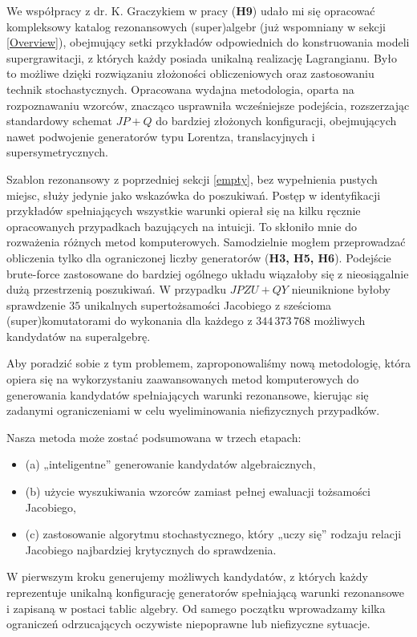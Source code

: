 \documentclass[12pt,a4paper]{article}
\begin{document}
We współpracy z dr. K. Graczykiem w pracy (\textbf{H9}) udało mi się opracować kompleksowy katalog rezonansowych (super)algebr (już wspomniany w sekcji \eqref{Overview}), obejmujący setki przykładów odpowiednich do konstruowania modeli supergrawitacji, z których każdy posiada unikalną realizację Lagrangianu. Było to możliwe dzięki rozwiązaniu złożoności obliczeniowych oraz zastosowaniu technik stochastycznych. Opracowana wydajna metodologia, oparta na rozpoznawaniu wzorców, znacząco usprawniła wcześniejsze podejścia, rozszerzając standardowy schemat $JP+Q$ do bardziej złożonych konfiguracji, obejmujących nawet podwojenie generatorów typu Lorentza, translacyjnych i supersymetrycznych.

Szablon rezonansowy z poprzedniej sekcji \eqref{empty}, bez wypełnienia pustych miejsc, służy jedynie jako wskazówka do poszukiwań. Postęp w identyfikacji przykładów spełniających wszystkie warunki opierał się na kilku ręcznie opracowanych przypadkach bazujących na intuicji. To skłoniło mnie do rozważenia różnych metod komputerowych. Samodzielnie mogłem przeprowadzać obliczenia tylko dla ograniczonej liczby generatorów (\textbf{H3, H5, H6}). Podejście brute-force zastosowane do bardziej ogólnego układu wiązałoby się z nieosiągalnie dużą przestrzenią poszukiwań. W przypadku $JPZU+QY$ nieuniknione byłoby sprawdzenie $35$ unikalnych supertożsamości Jacobiego z sześcioma (super)komutatorami do wykonania dla każdego z $344\,373\,768$ możliwych kandydatów na superalgebrę.

Aby poradzić sobie z tym problemem, zaproponowaliśmy nową metodologię, która opiera się na wykorzystaniu zaawansowanych metod komputerowych do generowania kandydatów spełniających warunki rezonansowe, kierując się zadanymi ograniczeniami w celu wyeliminowania niefizycznych przypadków.

Nasza metoda może zostać podsumowana w trzech etapach:
\begin{itemize}
	\item (a) „inteligentne” generowanie kandydatów algebraicznych,
	\item (b) użycie wyszukiwania wzorców zamiast pełnej ewaluacji tożsamości Jacobiego,
	\item (c) zastosowanie algorytmu stochastycznego, który „uczy się” rodzaju relacji Jacobiego najbardziej krytycznych do sprawdzenia.
\end{itemize}

W pierwszym kroku generujemy możliwych kandydatów, z których każdy reprezentuje unikalną konfigurację generatorów spełniającą warunki rezonansowe i zapisaną w postaci tablic algebry. Od samego początku wprowadzamy kilka ograniczeń odrzucających oczywiste niepoprawne lub niefizyczne sytuacje.
\end{document}
